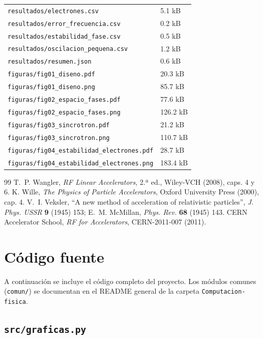 \documentclass[11pt,a4paper]{article}
\begin{document}
{\begin{longtable}{ll}
\texttt{resultados/electrones.csv} & 5.1 kB \\
\texttt{resultados/error\_frecuencia.csv} & 0.2 kB \\
\texttt{resultados/estabilidad\_fase.csv} & 0.5 kB \\
\texttt{resultados/oscilacion\_pequena.csv} & 1.2 kB \\
\texttt{resultados/resumen.json} & 0.6 kB \\
\texttt{figuras/fig01\_diseno.pdf} & 20.3 kB \\
\texttt{figuras/fig01\_diseno.png} & 85.7 kB \\
\texttt{figuras/fig02\_espacio\_fases.pdf} & 77.6 kB \\
\texttt{figuras/fig02\_espacio\_fases.png} & 126.2 kB \\
\texttt{figuras/fig03\_sincrotron.pdf} & 21.2 kB \\
\texttt{figuras/fig03\_sincrotron.png} & 110.7 kB \\
\texttt{figuras/fig04\_estabilidad\_electrones.pdf} & 28.7 kB \\
\texttt{figuras/fig04\_estabilidad\_electrones.png} & 183.4 kB \\
\bottomrule
\end{longtable}}

\begin{thebibliography}{99}
 T.~P. Wangler, \emph{RF Linear Accelerators}, 2.ª ed., Wiley-VCH (2008), caps. 4 y 6.
 K. Wille, \emph{The Physics of Particle Accelerators}, Oxford University Press (2000), cap. 4.
 V.~I. Veksler, ``A new method of acceleration of relativistic particles'', \emph{J. Phys. USSR} \textbf{9} (1945) 153; E.~M. McMillan, \emph{Phys. Rev.} \textbf{68} (1945) 143.
 CERN Accelerator School, \emph{RF for Accelerators}, CERN-2011-007 (2011).
\end{thebibliography}
\appendix
\section{Código fuente}\label{sec:codigo}
A continuación se incluye el código completo del proyecto. Los módulos comunes (\texttt{comun/}) se documentan en el README general de la carpeta \texttt{Computacion-fisica}.
\subsection*{\texttt{src/graficas.py}}

\end{document}
